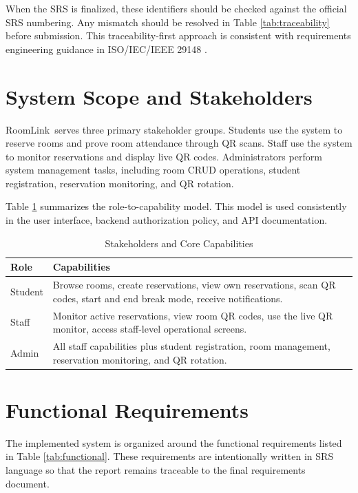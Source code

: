 \documentclass[conference]{IEEEtran}
\newcommand{\RoomLink}{RoomLink}
\begin{document}
When the SRS is finalized, these identifiers should be checked against the
official SRS numbering. Any mismatch should be resolved in Table
\ref{tab:traceability} before submission. This traceability-first approach is
consistent with requirements engineering guidance in ISO/IEC/IEEE 29148
\cite{ieee29148}.

\section{System Scope and Stakeholders}
\RoomLink\ serves three primary stakeholder groups. Students use the system to
reserve rooms and prove room attendance through QR scans. Staff use the system
to monitor reservations and display live QR codes. Administrators perform
system management tasks, including room CRUD operations, student registration,
reservation monitoring, and QR rotation.

Table \ref{tab:roles} summarizes the role-to-capability model. This model is
used consistently in the user interface, backend authorization policy, and API
documentation.

\begin{table}[htbp]
\caption{Stakeholders and Core Capabilities}
\label{tab:roles}
\centering
\begin{tabularx}{\linewidth}{@{}lX@{}}
\toprule
\textbf{Role} & \textbf{Capabilities} \\
\midrule
Student & Browse rooms, create reservations, view own reservations, scan QR
codes, start and end break mode, receive notifications. \\
Staff & Monitor active reservations, view room QR codes, use the live QR
monitor, access staff-level operational screens. \\
Admin & All staff capabilities plus student registration, room management,
reservation monitoring, and QR rotation. \\
\bottomrule
\end{tabularx}
\end{table}

\section{Functional Requirements}
The implemented system is organized around the functional requirements listed
in Table \ref{tab:functional}. These requirements are intentionally written in
SRS language so that the report remains traceable to the final requirements
document.
\end{document}
